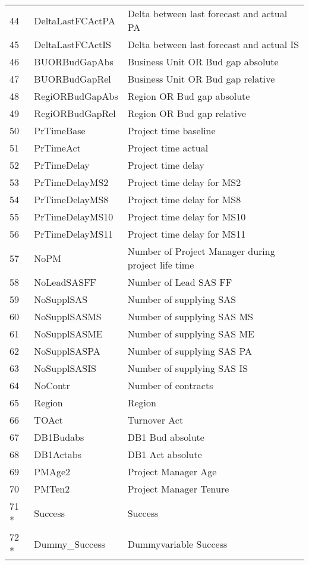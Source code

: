 \begin{longtable}[ht]{p{} p{}p{}}
44    & DeltaLastFCActPA & Delta between last forecast and actual PA \\
45    & DeltaLastFCActIS & Delta between last forecast and actual IS \\
46    & BUORBudGapAbs & Business Unit OR Bud gap absolute \\
47    & BUORBudGapRel & Business Unit OR Bud gap relative \\
48    & RegiORBudGapAbs & Region OR Bud gap absolute \\
49    & RegiORBudGapRel & Region OR Bud gap relative \\
50    & PrTimeBase & Project time baseline \\
51    & PrTimeAct & Project time actual \\
52    & PrTimeDelay & Project time delay \\
53    & PrTimeDelayMS2 & Project time delay for MS2 \\
54    & PrTimeDelayMS8 & Project time delay for MS8 \\
55    & PrTimeDelayMS10 & Project time delay for MS10 \\
56    & PrTimeDelayMS11 & Project time delay for MS11 \\
57    & NoPM  & Number of Project Manager during project life time \\
58    & NoLeadSASFF & Number of Lead SAS FF \\
59    & NoSupplSAS & Number of supplying SAS \\
60    & NoSupplSASMS & Number of supplying SAS MS \\
61    & NoSupplSASME & Number of supplying SAS ME \\
62    & NoSupplSASPA & Number of supplying SAS PA \\
63    & NoSupplSASIS & Number of supplying SAS IS \\
64    & NoContr & Number of contracts \\
65    & Region & Region \\
66    & TOAct & Turnover Act \\
67    & DB1Budabs & DB1 Bud absolute \\
68    & DB1Actabs & DB1 Act absolute \\
69    & PMAge2 & Project Manager Age \\
70    & PMTen2 & Project Manager Tenure \\
71 *   & Success & Success \\
72 *  & Dummy\_Success & Dummyvariable Success \\

\end{longtable}
